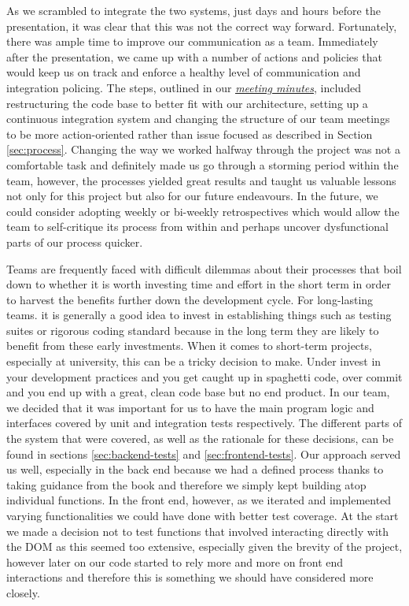 \documentclass[a4paper]{report}
\begin{document}
	\par As we scrambled to integrate the two systems, just days and hours before the presentation, it was clear that this was not the correct way forward. Fortunately, there was ample time to improve our communication as a team. Immediately after the presentation, we came up with a number of actions and policies that would keep us on track and enforce a healthy level of communication and integration policing. The steps, outlined in our \href{https://github.com/davidbenicek/raytracer/wiki/5th-Meeting-(14th-Feb-2018)}{\underline{\textit{meeting minutes}}}, included restructuring the code base to better fit with our architecture, setting up a continuous integration system and changing the structure of our team meetings to be more action-oriented rather than issue focused as described in Section \ref{sec:process}. Changing the way we worked halfway through the project was not a comfortable task and definitely made us go through a storming period within the team, however, the processes yielded great results and taught us valuable lessons not only for this project but also for our future endeavours. In the future, we could consider adopting weekly or bi-weekly retrospectives which would allow the team to self-critique its process from within and perhaps uncover dysfunctional parts of our process quicker. \newline
	
	\par Teams are frequently faced with difficult dilemmas about their processes that boil down to whether it is worth investing time and effort in the short term in order to harvest the benefits further down the development cycle. For long-lasting teams. it is generally a good idea to invest in establishing things such as testing suites or rigorous coding standard because in the long term they are likely to benefit from these early investments. When it comes to short-term projects, especially at university, this can be a tricky decision to make. Under invest in your development practices and you get caught up in spaghetti code, over commit and you end up with a great, clean code base but no end product. In our team, we decided that it was important for us to have the main program logic and interfaces covered by unit and integration tests respectively. The different parts of the system that were covered, as well as the rationale for these decisions,  can be found in sections \ref{sec:backend-tests} and \ref{sec:frontend-tests}. Our approach served us well, especially in the back end because we had a defined process thanks to taking guidance from the book \cite{suffern_ray_2007} and therefore we simply kept building atop individual functions. In the front end, however, as we iterated and implemented varying functionalities we could have done with better test coverage. At the start we made a decision not to test functions that involved interacting directly with the DOM as this seemed too extensive, especially given the brevity of the project, however later on our code started to rely more and more on front end interactions and therefore this is something we should have considered more closely. \newline
	
\end{document}

